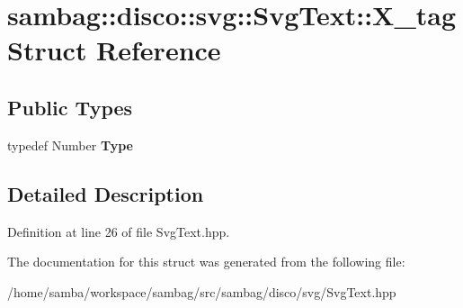 \hypertarget{structsambag_1_1disco_1_1svg_1_1_svg_text_1_1_x__tag}{
\section{sambag::disco::svg::SvgText::X\_\-tag Struct Reference}
\label{structsambag_1_1disco_1_1svg_1_1_svg_text_1_1_x__tag}
}
\subsection*{Public Types}
\begin{DoxyCompactItemize}
\item 
\hypertarget{structsambag_1_1disco_1_1svg_1_1_svg_text_1_1_x__tag_adb3726eaf736e9e954db5bca65652d8d}{
typedef Number {\bfseries Type}}
\label{structsambag_1_1disco_1_1svg_1_1_svg_text_1_1_x__tag_adb3726eaf736e9e954db5bca65652d8d}

\end{DoxyCompactItemize}


\subsection{Detailed Description}


Definition at line 26 of file SvgText.hpp.



The documentation for this struct was generated from the following file:\begin{DoxyCompactItemize}
\item 
/home/samba/workspace/sambag/src/sambag/disco/svg/SvgText.hpp\end{DoxyCompactItemize}
